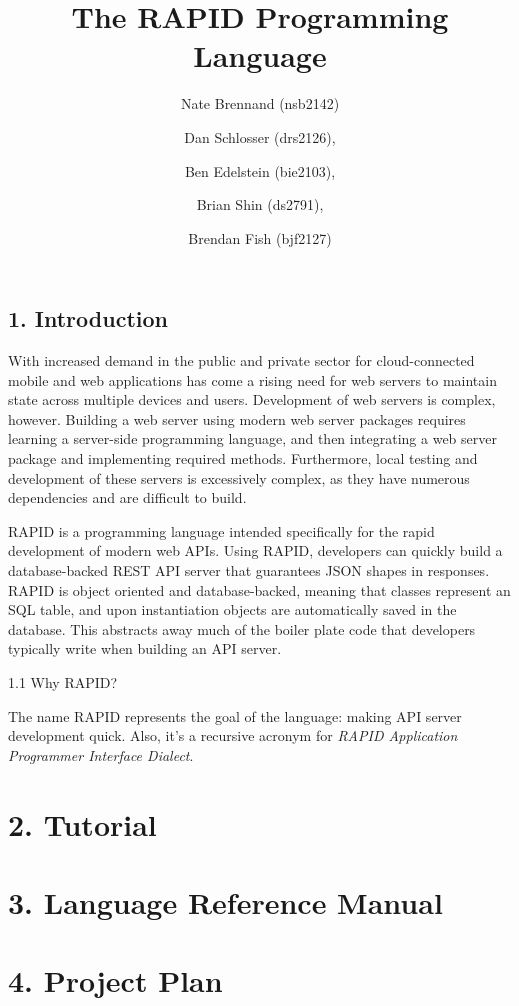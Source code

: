 \documentclass[11pt]{article}
\author{
  Nate Brennand (nsb2142)
  \and Dan Schlosser (drs2126),
  \and Ben Edelstein (bie2103),
  \and Brian Shin (ds2791),
  \and Brendan Fish (bjf2127)
}
\title{The RAPID Programming Language}
\begin{document}
\setlength{\parskip}{.1 in}

\maketitle
\newpage

\subsection*{1. Introduction}

With increased demand in the public and private sector for cloud-connected mobile and web applications has come a rising need for web servers to maintain state across multiple devices and users.
Development of web servers is complex, however. Building a web server using modern web server packages requires learning a server-side programming language, and then integrating a web server package and implementing required methods.
Furthermore, local testing and development of these servers is excessively complex, as they have numerous dependencies and are difficult to build.

RAPID is a programming language intended specifically for the rapid development of modern web APIs.
Using RAPID, developers can quickly build a database-backed REST API server that guarantees JSON shapes in responses.
RAPID is object oriented and database-backed, meaning that classes represent an SQL table, and upon instantiation objects are automatically saved in the database.
This abstracts away much of the boiler plate code that developers typically write when building an API server.


1.1 Why RAPID?

The name RAPID represents the goal of the language: making API server development quick.
Also, it's a recursive acronym for \textit{RAPID Application Programmer Interface Dialect}.



\section*{2. Tutorial}

\newpage

\section*{3. Language Reference Manual}

\newpage

\section*{4. Project Plan}

\newpage
\end{document}
